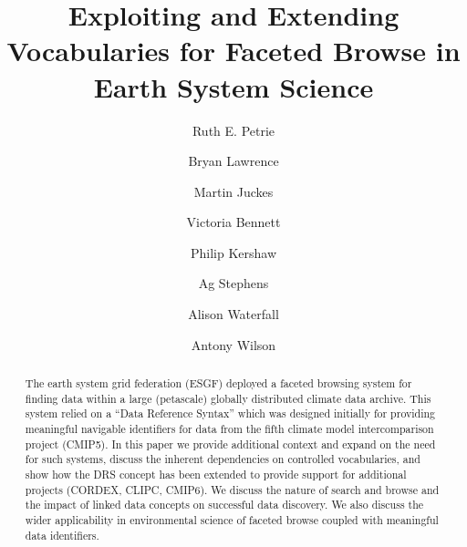 \documentclass[final,1p,times,twocolumn,authoryear]{elsarticle}
\begin{document}
\begin{frontmatter}



\title{Exploiting and Extending Vocabularies for Faceted Browse in Earth System Science}



\author[1]{Ruth E. Petrie}
\author[2,3]{Bryan Lawrence}
\author[1]{Martin Juckes}
\author[1,4]{Victoria Bennett}
\author[4]{Philip Kershaw}
\author[1]{Ag Stephens}
\author[4]{Alison Waterfall}
\author[5]{Antony Wilson}

\address[1]{National Centre for Atmospheric Science, CEDA, Science and Technology Facilities Council, UK}
\address[2]{National Centre for Atmospheric Science, Department of Meteorology, University of Reading, UK}
\address[3]{Department of Computer Science, University of Reading, UK}
\address[4]{National Centre for Earth Observation, CEDA, Science and Technology Facilities Council, UK}
\address[5]{Scientific Computing Department, Science and Technology Facilities Council, UK}


\begin{abstract}

The earth system grid federation (ESGF) deployed a faceted browsing system for finding data within a large (petascale) globally distributed climate data archive. This system relied on a ``Data Reference Syntax'' which was designed initially for providing meaningful navigable identifiers for data from the fifth climate model intercomparison project (CMIP5). In this paper we provide additional context and expand on the need for such systems, discuss the inherent dependencies on controlled vocabularies, and show how the DRS concept has been extended to provide support for additional projects (CORDEX, CLIPC, CMIP6). We discuss the nature of search and browse and the impact of linked data concepts on successful data discovery. We also discuss the wider applicability in environmental science of faceted browse coupled with meaningful data identifiers.


\end{abstract}
\end{frontmatter}
\end{document}
